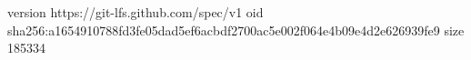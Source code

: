 version https://git-lfs.github.com/spec/v1
oid sha256:a1654910788fd3fe05dad5ef6acbdf2700ac5e002f064e4b09e4d2e626939fe9
size 185334
